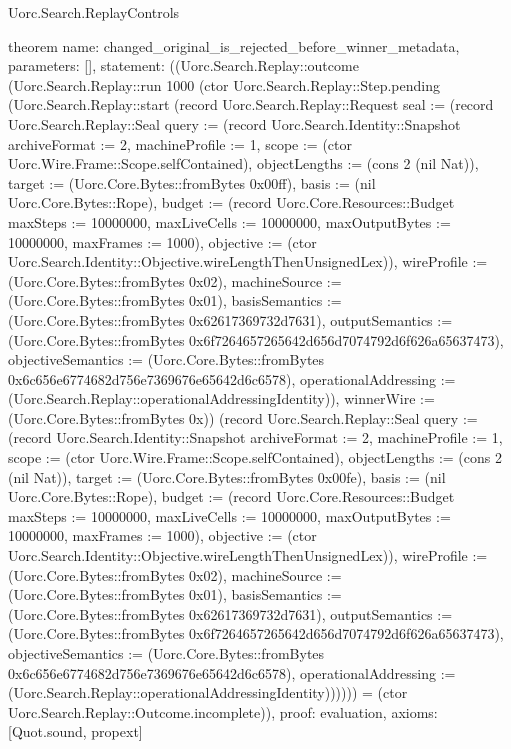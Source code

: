 \begin{lexlean}{Uorc.Search.ReplayControls}
\begin{semanticmodule}
theorem{
  name: changed_original_is_rejected_before_winner_metadata,
  parameters: [],
  statement: ((Uorc.Search.Replay::outcome (Uorc.Search.Replay::run 1000 (ctor Uorc.Search.Replay::Step.pending (Uorc.Search.Replay::start (record Uorc.Search.Replay::Request {seal := (record Uorc.Search.Replay::Seal {query := (record Uorc.Search.Identity::Snapshot {archiveFormat := 2, machineProfile := 1, scope := (ctor Uorc.Wire.Frame::Scope.selfContained), objectLengths := (cons 2 (nil Nat)), target := (Uorc.Core.Bytes::fromBytes 0x00ff), basis := (nil Uorc.Core.Bytes::Rope), budget := (record Uorc.Core.Resources::Budget {maxSteps := 10000000, maxLiveCells := 10000000, maxOutputBytes := 10000000, maxFrames := 1000}), objective := (ctor Uorc.Search.Identity::Objective.wireLengthThenUnsignedLex)}), wireProfile := (Uorc.Core.Bytes::fromBytes 0x02), machineSource := (Uorc.Core.Bytes::fromBytes 0x01), basisSemantics := (Uorc.Core.Bytes::fromBytes 0x62617369732d7631), outputSemantics := (Uorc.Core.Bytes::fromBytes 0x6f7264657265642d656d7074792d6f626a65637473), objectiveSemantics := (Uorc.Core.Bytes::fromBytes 0x6c656e6774682d756e7369676e65642d6c6578), operationalAddressing := (Uorc.Search.Replay::operationalAddressingIdentity)}), winnerWire := (Uorc.Core.Bytes::fromBytes 0x)}) (record Uorc.Search.Replay::Seal {query := (record Uorc.Search.Identity::Snapshot {archiveFormat := 2, machineProfile := 1, scope := (ctor Uorc.Wire.Frame::Scope.selfContained), objectLengths := (cons 2 (nil Nat)), target := (Uorc.Core.Bytes::fromBytes 0x00fe), basis := (nil Uorc.Core.Bytes::Rope), budget := (record Uorc.Core.Resources::Budget {maxSteps := 10000000, maxLiveCells := 10000000, maxOutputBytes := 10000000, maxFrames := 1000}), objective := (ctor Uorc.Search.Identity::Objective.wireLengthThenUnsignedLex)}), wireProfile := (Uorc.Core.Bytes::fromBytes 0x02), machineSource := (Uorc.Core.Bytes::fromBytes 0x01), basisSemantics := (Uorc.Core.Bytes::fromBytes 0x62617369732d7631), outputSemantics := (Uorc.Core.Bytes::fromBytes 0x6f7264657265642d656d7074792d6f626a65637473), objectiveSemantics := (Uorc.Core.Bytes::fromBytes 0x6c656e6774682d756e7369676e65642d6c6578), operationalAddressing := (Uorc.Search.Replay::operationalAddressingIdentity)}))))) = (ctor Uorc.Search.Replay::Outcome.incomplete)),
  proof: evaluation{},
  axioms: [Quot.sound, propext]
}


\end{semanticmodule}
\end{lexlean}
